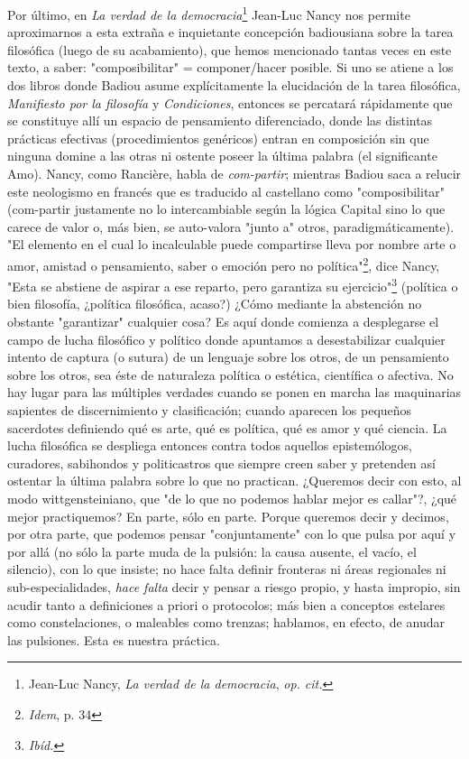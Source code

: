 \documentclass{book}
\begin{document}
Por último, en \emph{La verdad de la democracia}\footnote{Jean-Luc
  Nancy, \emph{La verdad de la democracia}, \emph{op. cit.}} Jean-Luc
Nancy nos permite aproximarnos a esta extraña e inquietante concepción
badiousiana sobre la tarea filosófica (luego de su acabamiento), que
hemos mencionado tantas veces en este texto, a saber: "composibilitar" =
componer/hacer posible. Si uno se atiene a los dos libros donde Badiou
asume explícitamente la elucidación de la tarea filosófica,
\emph{Manifiesto por la filosofía} y \emph{Condiciones}, entonces se
percatará rápidamente que se constituye allí un espacio de pensamiento
diferenciado, donde las distintas prácticas efectivas (procedimientos
genéricos) entran en composición sin que ninguna domine a las otras ni
ostente poseer la última palabra (el significante Amo). Nancy, como
Rancière, habla de \emph{com-partir}; mientras Badiou saca a relucir
este neologismo en francés que es traducido al castellano como
"composibilitar" (com-partir justamente no lo intercambiable según la
lógica Capital sino lo que carece de valor o, más bien, se auto-valora
"junto a" otros, paradigmáticamente). "El elemento en el cual lo
incalculable puede compartirse lleva por nombre arte o amor, amistad o
pensamiento, saber o emoción pero no política"\footnote{\emph{Idem}, p.
  34}, dice Nancy, "Esta se abstiene de aspirar a ese reparto, pero
garantiza su ejercicio"\footnote{\emph{Ibíd.}} (política o bien
filosofía, ¿política filosófica, acaso?) ¿Cómo mediante la abstención no
obstante "garantizar" cualquier cosa? Es aquí donde comienza a
desplegarse el campo de lucha filosófico y político donde apuntamos a
desestabilizar cualquier intento de captura (o sutura) de un lenguaje
sobre los otros, de un pensamiento sobre los otros, sea éste de
naturaleza política o estética, científica o afectiva. No hay lugar para
las múltiples verdades cuando se ponen en marcha las maquinarias
sapientes de discernimiento y clasificación; cuando aparecen los
pequeños sacerdotes definiendo qué es arte, qué es política, qué es amor
y qué ciencia. La lucha filosófica se despliega entonces contra todos
aquellos epistemólogos, curadores, sabihondos y politicastros que
siempre creen saber y pretenden así ostentar la última palabra sobre lo
que no practican. ¿Queremos decir con esto, al modo wittgensteiniano,
que "de lo que no podemos hablar mejor es callar"?, ¿qué mejor
practiquemos? En parte, sólo en parte. Porque queremos decir y decimos,
por otra parte, que podemos pensar "conjuntamente" con lo que pulsa por
aquí y por allá (no sólo la parte muda de la pulsión: la causa ausente,
el vacío, el silencio), con lo que insiste; no hace falta definir
fronteras ni áreas regionales ni sub-especialidades, \emph{hace falta}
decir y pensar a riesgo propio, y hasta impropio, sin acudir tanto a
definiciones a priori o protocolos; más bien a conceptos estelares como
constelaciones, o maleables como trenzas; hablamos, en efecto, de anudar
las pulsiones. Esta es nuestra práctica.
\end{document}
